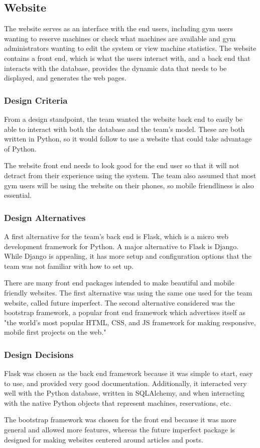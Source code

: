 \documentclass[PPFS.tex]{template/subfiles}
\begin{document}
\subsection{Website}
The website serves as an interface with the end users, including gym users wanting to reserve machines or check what machines are available and gym administrators wanting to edit the system or view machine statistics.
The website contains a front end, which is what the users interact with, and a back end that interacts with the database, provides the dynamic data that needs to be displayed, and generates the web pages. 

\subsubsection{Design Criteria}
From a design standpoint, the team wanted the website back end to easily be able to interact with both the database and the team's model. These are both written in Python, so it would follow to use a website that could take advantage of Python.

The website front end needs to look good for the end user so that it will not detract from their experience using the system. The team also assumed that most gym users will be using the website on their phones, so mobile friendliness is also essential.

\subsubsection{Design Alternatives}
A first alternative for the team's back end is Flask, which is a micro web development framework for Python.
A major alternative to Flask is Django. While Django is appealing, it has more setup and configuration options that the team was not familiar with how to set up.

There are many front end packages intended to make beautiful and mobile friendly websites. The first alternative was using the same one used for the team website, called future imperfect. The second alternative considered was the bootstrap framework, a popular front end framework which advertises itself as "the world's most popular HTML, CSS, and JS framework for making responsive, mobile first projects on the web."

\subsubsection{Design Decisions}
Flask was chosen as the back end framework because it was simple to start, easy to use, and provided very good documentation. Additionally, it interacted very well with the Python database, written in SQLAlchemy, and when interacting with the native Python objects that represent machines, reservations, etc.

The bootstrap framework was chosen for the front end because it was more general and allowed more features, whereas the future imperfect package is designed for making websites centered around articles and posts.
\end{document}
